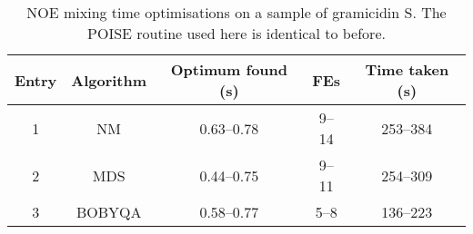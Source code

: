 \begin{table}[htb]
    \centering
    \begin{tabular}{ccccc}
        \toprule
        Entry & Algorithm & Optimum found (\unit{\s}) & FEs    & Time taken (\unit{\s}) \\
        \midrule
        1     & NM        & 0.63--0.78              & 9--14  & 253--384             \\
        2     & MDS       & 0.44--0.75              & 9--11  & 254--309             \\
        3     & BOBYQA    & 0.58--0.77              & 5--8   & 136--223             \\
        \bottomrule
    \end{tabular}
    \caption[NOE mixing time optimisations on gramicidin]{
        NOE mixing time optimisations on a sample of gramicidin S.
        The POISE routine used here is identical to before.
    }
    \label{tbl:poise_noe_grami}
\end{table}
